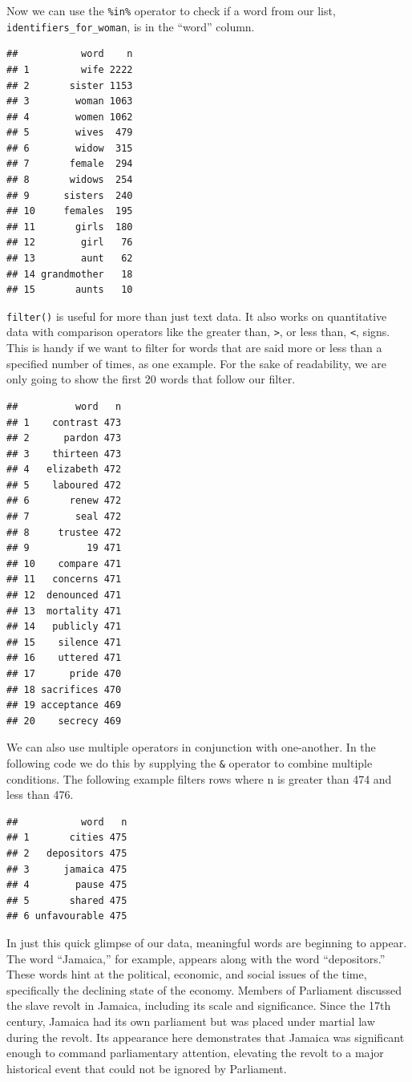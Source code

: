 \documentclass[
]{article}
\begin{document}
Now we can use the \texttt{\%in\%} operator to check if a word from our
list, \texttt{identifiers\_for\_woman}, is in the ``word'' column.

\begin{verbatim}
##           word    n
## 1         wife 2222
## 2       sister 1153
## 3        woman 1063
## 4        women 1062
## 5        wives  479
## 6        widow  315
## 7       female  294
## 8       widows  254
## 9      sisters  240
## 10     females  195
## 11       girls  180
## 12        girl   76
## 13        aunt   62
## 14 grandmother   18
## 15       aunts   10
\end{verbatim}

\texttt{filter()} is useful for more than just text data. It also works
on quantitative data with comparison operators like the greater than,
\texttt{\textgreater{}}, or less than, \texttt{\textless{}}, signs. This
is handy if we want to filter for words that are said more or less than
a specified number of times, as one example. For the sake of
readability, we are only going to show the first 20 words that follow
our filter.

\begin{verbatim}
##          word   n
## 1    contrast 473
## 2      pardon 473
## 3    thirteen 473
## 4   elizabeth 472
## 5    laboured 472
## 6       renew 472
## 7        seal 472
## 8     trustee 472
## 9          19 471
## 10    compare 471
## 11   concerns 471
## 12  denounced 471
## 13  mortality 471
## 14   publicly 471
## 15    silence 471
## 16    uttered 471
## 17      pride 470
## 18 sacrifices 470
## 19 acceptance 469
## 20    secrecy 469
\end{verbatim}

We can also use multiple operators in conjunction with one-another. In
the following code we do this by supplying the \texttt{\&} operator to
combine multiple conditions. The following example filters rows where n
is greater than 474 and less than 476.

\begin{verbatim}
##           word   n
## 1       cities 475
## 2   depositors 475
## 3      jamaica 475
## 4        pause 475
## 5       shared 475
## 6 unfavourable 475
\end{verbatim}

In just this quick glimpse of our data, meaningful words are beginning
to appear. The word ``Jamaica,'' for example, appears along with the
word ``depositors.'' These words hint at the political, economic, and
social issues of the time, specifically the declining state of the
economy. Members of Parliament discussed the slave revolt in Jamaica,
including its scale and significance. Since the 17th century, Jamaica
had its own parliament but was placed under martial law during the
revolt. Its appearance here demonstrates that Jamaica was significant
enough to command parliamentary attention, elevating the revolt to a
major historical event that could not be ignored by Parliament.
\end{document}
